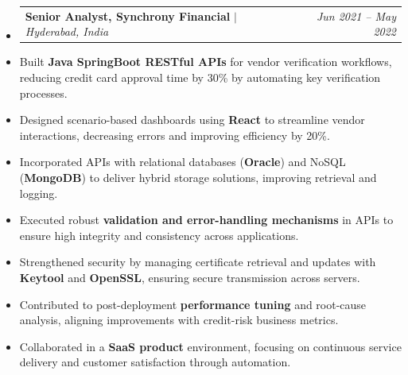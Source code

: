 \documentclass[a4paper,10pt]{article}
\makeatletter
\newcommand{\resumeSubheading}[4]{
  \vspace{-1pt}\item
    \begin{tabular*}{\linewidth}{l@{\extracolsep{\fill}}r}
      \textbf{#1} $|$ \textit{#2} & \textit{#4} \\
    \end{tabular*}\vspace{-4pt}
}
\newcommand{\textbulletlight}{\raisebox{0.15ex}{\scalebox{0.6}{$\bullet$}}}
\makeatother
\begin{document}
\vspace{-2pt}
\begin{itemize}[leftmargin=0pt, rightmargin=0pt, label={}, itemsep=0pt]
    \resumeSubheading{Senior Analyst, Synchrony Financial}{Hyderabad, India}
    {}{Jun 2021 -- May 2022}
\end{itemize}\vspace{-6pt}
\begin{itemize}[leftmargin=12pt, rightmargin=0pt, label={\textbulletlight}, itemsep=0pt, topsep=2pt]
        \item \small Built \textbf{Java SpringBoot RESTful APIs} for vendor verification workflows, reducing credit card approval time by 30\% by automating key verification processes.
        \item Designed scenario-based dashboards using \textbf{React} to streamline vendor interactions, decreasing errors and improving efficiency by 20\%.
        \item Incorporated APIs with relational databases (\textbf{Oracle}) and NoSQL (\textbf{MongoDB}) to deliver hybrid storage solutions, improving retrieval and logging.
        \item Executed robust \textbf{validation and error-handling mechanisms} in APIs to ensure high integrity and consistency across applications.
        \item Strengthened security by managing certificate retrieval and updates with \textbf{Keytool} and \textbf{OpenSSL}, ensuring secure transmission across servers.
        \item Contributed to post-deployment \textbf{performance tuning} and root-cause analysis, aligning improvements with credit-risk business metrics.
        \item Collaborated in a \textbf{SaaS product} environment, focusing on continuous service delivery and customer satisfaction through automation.
\end{itemize}
\end{document}
